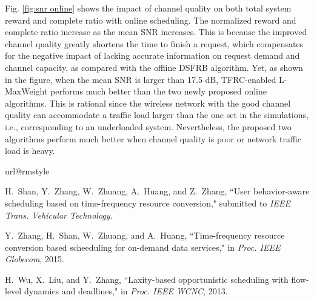 \documentclass[journal,letterpaper,12pt,oneside,onecolumn,draftclsnofoot]{IEEEtran}
\begin{document}
Fig. \ref{fig:snr online} shows the impact of channel quality on both total system reward and complete ratio with online scheduling.
The normalized reward and complete ratio increase as the mean SNR increases.
This is because the improved channel quality greatly shortens the time to finish a request, which compensates for the negative impact of lacking accurate information on request demand and channel capacity, as compared with the offline DSFRB algorithm.
Yet, as shown in the figure, when the mean SNR is larger than 17.5 dB, TFRC-enabled L-MaxWeight performs much better than the two newly proposed online algorithms. This is rational since the wireless network with the good channel quality can accommodate a traffic load larger than the one set in the simulations, i.e., corresponding to an underloaded system.
Nevertheless, the proposed two algorithms perform much better when channel quality is poor or network traffic load is heavy.





\begin{thebibliography}{10}

\providecommand{\url}[1]{#1} \csname url@rmstyle\endcsname
\providecommand{\newblock}{\relax} \providecommand{\bibinfo}[2]{#2}
\providecommand\BIBentrySTDinterwordspacing{\spaceskip=0pt\relax}
\providecommand\BIBentryALTinterwordstretchfactor{4}
\providecommand\BIBentryALTinterwordspacing{\spaceskip=\fontdimen2\font
plus \BIBentryALTinterwordstretchfactor\fontdimen3\font minus
  \fontdimen4\font\relax}
\providecommand\BIBforeignlanguage[2]{{\expandafter\ifx\csname l@#1\endcsname\relax
\typeout{** WARNING: IEEEtran.bst: No hyphenation pattern has been}\typeout{** loaded for the language `#1'. Using the pattern for}\typeout{** the default language instead.}\else \language=\csname l@#1\endcsname \fi #2}}

H.~Shan, Y.~Zhang, W.~Zhuang, A.~Huang, and Z.~Zhang, ``User behavior-aware scheduling based on time-frequency resource conversion," submitted to \emph{ IEEE Trans. Vehicular Technology}.

Y.~Zhang, H.~Shan, W.~Zhuang, and A.~Huang, ``Time-frequency resource conversion based scheeduling for on-demand data services," in \emph{Proc. IEEE Globecom}, 2015.

H.~Wu, X.~Liu, and Y.~Zhang, ``Laxity-based opportunistic scheduling with flow-level dynamics and deadlines," in \emph{Proc. IEEE WCNC}, 2013.


\end{thebibliography}
\end{document}
